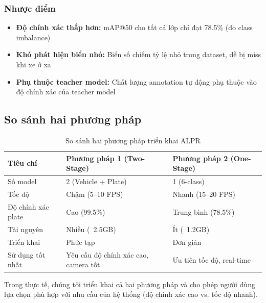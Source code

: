 \subsubsection{Nhược điểm}
\begin{itemize}
    \item \textbf{Độ chính xác thấp hơn:} mAP@50 cho tất cả lớp chỉ đạt 78.5\% (do class imbalance)
    \item \textbf{Khó phát hiện biển nhỏ:} Biển số chiếm tỷ lệ nhỏ trong dataset, dễ bị miss khi xe ở xa
    \item \textbf{Phụ thuộc teacher model:} Chất lượng annotation tự động phụ thuộc vào độ chính xác của teacher model
\end{itemize}

\subsection{So sánh hai phương pháp}

\begin{table}[!ht]
\centering
\caption{So sánh hai phương pháp triển khai ALPR}
\label{tab:alpr_method_comparison_theory}
\begin{tabular}{|l|p{5cm}|p{5cm}|}
\hline
\textbf{Tiêu chí} & \textbf{Phương pháp 1 (Two-Stage)} & \textbf{Phương pháp 2 (One-Stage)} \\ \hline
Số model & 2 (Vehicle + Plate) & 1 (6-class) \\ \hline
Tốc độ & Chậm (5--10 FPS) & Nhanh (15--20 FPS) \\ \hline
Độ chính xác plate & Cao (99.5\%) & Trung bình (78.5\%) \\ \hline
Tài nguyên & Nhiều (~2.5GB) & Ít (~1.2GB) \\ \hline
Triển khai & Phức tạp & Đơn giản \\ \hline
Sử dụng tốt nhất & Yêu cầu độ chính xác cao, camera tốt & Ưu tiên tốc độ, real-time \\ \hline
\end{tabular}
\end{table}

Trong thực tế, chúng tôi triển khai cả hai phương pháp và cho phép người dùng lựa chọn phù hợp với nhu cầu của hệ thống (độ chính xác cao vs. tốc độ nhanh).

